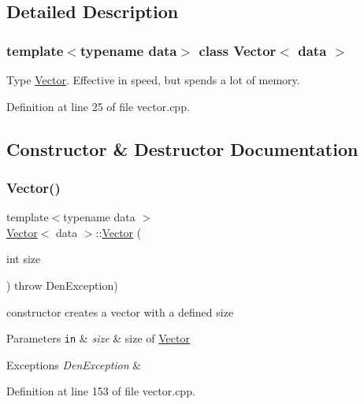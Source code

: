 \subsection{Detailed Description}
\subsubsection*{template$<$typename data$>$\newline
class Vector$<$ data $>$}

Type \hyperlink{classVector}{Vector}. Effective in speed, but spends a lot of memory. 

Definition at line 25 of file vector.\+cpp.



\subsection{Constructor \& Destructor Documentation}
\mbox{\label{classVector_aba82b0f3e3fd3d17bf2d19b04a8361b7}} 
\subsubsection{\texorpdfstring{Vector()}{Vector()}\hspace{0.1cm}{\footnotesize\ttfamily [1/5]}}
{\footnotesize\ttfamily template$<$typename data $>$ \\
\hyperlink{classVector}{Vector}$<$ data $>$\+::\hyperlink{classVector}{Vector} (\begin{DoxyParamCaption}\item[{int}]{size }\end{DoxyParamCaption}) throw  Den\+Exception) }



constructor  creates a vector with a defined size 


\begin{DoxyParams}[1]{Parameters}
\mbox{\tt in}  & {\em size} & size of \hyperlink{classVector}{Vector} \\
\hline
\end{DoxyParams}

\begin{DoxyExceptions}{Exceptions}
{\em Den\+Exception} & \\
\hline
\end{DoxyExceptions}


Definition at line 153 of file vector.\+cpp.



